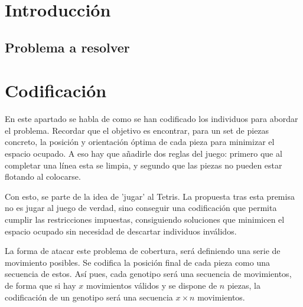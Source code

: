 \documentclass[11pt,spanish,listoffigures,listoftables]{tfgetsinf}
\begin{document}


\chapter{Introducción}

\section{Problema a resolver}

\mainmatter
\chapter{Codificación}
En este apartado se habla de como se han codificado los individuos para abordar el problema. Recordar que el objetivo es encontrar, para un set de piezas concreto, la posición y orientación óptima de cada pieza para minimizar el espacio ocupado. A eso hay que añadirle dos reglas del juego: primero que al completar una línea esta se limpia, y segundo que las piezas no pueden estar flotando al colocarse.

Con esto, se parte de la idea de 'jugar' al Tetris. La propuesta tras esta premisa no es jugar al juego de verdad, sino conseguir una codificación que permita cumplir las restricciones impuestas, consiguiendo soluciones que minimicen el espacio ocupado sin necesidad de descartar individuos inválidos. 

La forma de atacar este problema de cobertura, será definiendo una serie de movimiento posibles. Se codifica la posición final de cada pieza como una secuencia de estos. Así pues, cada genotipo será una secuencia de movimientos, de forma que si hay $x$ movimientos válidos y se dispone de $n$ piezas, la codificación de un genotipo será una secuencia $x \times n$ movimientos.
\end{document}
